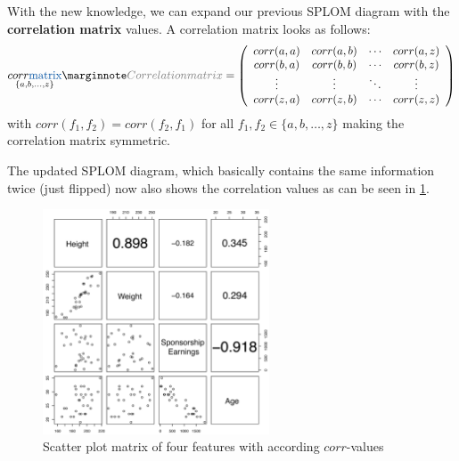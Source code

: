 With the new knowledge, we can expand our previous SPLOM diagram with the \textbf{correlation matrix} values. A correlation matrix looks as follows:
\begin{align*}
  \underset{\{a, b, \dots, z\}}{corr\text{\color{mathblue}  matrix}}\sidenote{Correlation matrix} = \left(\begin{array}{cccc}
    corr(a,a) & corr(a,b) & \cdots & corr(a,z)\\
    corr(b,a) & corr(b,b) & \cdots & corr(b,z)\\
    \vdots & \vdots & \ddots & \vdots\\
    corr(z,a) & corr(z,b) & \cdots & corr(z,z)
  \end{array}\right)
\end{align*}
with $corr(f_1, f_2) = corr(f_2, f_1)$ for all $f_1, f_2 \in \{a, b, \dots, z\}$ making the correlation matrix symmetric.

The updated SPLOM diagram, which basically contains the same information twice (just flipped) now also shows the correlation values as can be seen in \ref{fig:2_splom_corr}.
\begin{figure}[H]
  \centering
  \includegraphics[width=0.6\textwidth]{assets/visualization_and_extraction/feature_relation/splom_updated.png}
  \caption{Scatter plot matrix of four features with according $corr$-values}
  \label{fig:2_splom_corr}
\end{figure}